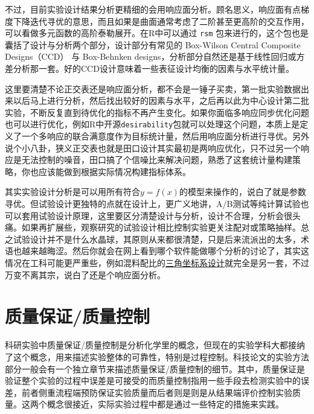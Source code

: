 \documentclass[]{tufte-book}
\begin{document}
不过，目前实验设计结果分析更精细的会用响应面分析。顾名思义，响应面有点梯度下降迭代寻优的意思，而且如果是曲面通常考虑了二阶甚至更高阶的交互作用，可以看做多元函数的高阶泰勒展开。在R中可以通过 \texttt{rsm} 包来进行的，这个包也是囊括了设计与分析两个部分，设计部分有常见的 Box-Wilson Central Composite Designs（CCD） 与 Box-Behnken designs，分析部分自然还是基于线性回归或方差分析那一套。好的CCD设计意味着一些表征设计均衡的因素与水平统计量。

这里要清楚不论正交表还是响应面分析，都不会是一锤子买卖，第一批实验数据出来以后马上进行分析，然后找出较好的因素与水平，之后再以此为中心设计第二批实验，不断反复直到待优化的指标不再产生变化。如果你面临多响应同步优化问题也可以进行优化，例如R中开源\texttt{desirability}包就可以处理这个问题，本质上是定义了一个多响应的联合满意度作为目标统计量，然后用响应面分析进行寻优。另外说个小八卦，狭义正交表也就是田口设计其实最初是两响应优化，只不过另一个响应是无法控制的噪音，田口搞了个信噪比来解决问题，熟悉了这套统计量构建策略，你也应该能做到根据实际情况构建指标体系。

其实实验设计分析是可以用所有符合\(y = f(x)\)的模型来操作的，说白了就是参数寻优。但试验设计更独特的点就在设计上，更广义地讲，A/B测试等纯计算试验也可以套用试验设计原理，这里要区分清楚设计与分析，设计不合理，分析会很头痛。如果再扩展些，观察研究的试验设计相比控制实验更关注配对或策略抽样。总之试验设计并不是什么水晶球，其原则从来都很清楚，只是后来流派出的太多，术语也越来越晦涩。然后你就会在网上看到哪个软件能做哪个分析的讨论了，其实这情况在工科可能更严重些，例如混料配比的\href{https://support.minitab.com/zh-cn/minitab/18/help-and-how-to/modeling-statistics/doe/supporting-topics/mixture-designs/what-is-a-mixture-design/}{三角坐标系设计}就完全是另一套，不过万变不离其宗，说白了还是个响应面分析。

\hypertarget{ux8d28ux91cfux4fddux8bc1ux8d28ux91cfux63a7ux5236}{%
\section{质量保证/质量控制}\label{ux8d28ux91cfux4fddux8bc1ux8d28ux91cfux63a7ux5236}}

科研实验中质量保证/质量控制是分析化学里的概念，但现在的实验学科大都接纳了这个概念，用来描述实验整体的可靠性，特别是过程控制。科技论文的实验方法部分一般会有一个独立章节来描述质量保证/质量控制的细节。其中，质量保证是验证整个实验的过程中误差是可接受的而质量控制指用一些手段去检测实验中的误差，前者侧重流程端预防保证实验质量而后者则是则是从结果端评价控制实验质量。这两个概念很接近，实际实验过程中都是通过一些特定的措施来实践。
\end{document}

